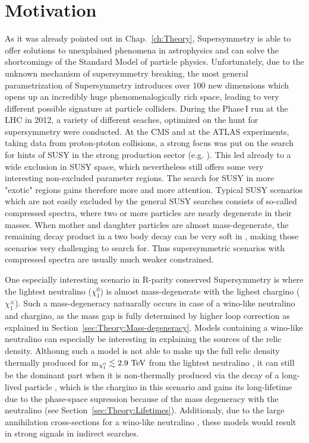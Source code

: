\section{Motivation}
\label{sec:Motivation}
As it was already pointed out in Chap.~\ref{ch:Theory}, Supersymmetry is able to offer solutions to unexplained phenomena in astrophysics and can solve the shortcomings of the Standard Model of particle physics.
Unfortunately, due to the unknown mechanism of supersymmetry breaking, the most general parametrization of Supersymmetry introduces over 100 new dimensions which opens up an incredibly huge phenomenalogically rich space, 
leading to very different possible signature at particle colliders. 
During the Phase\,I run at the LHC in 2012, a variety of different seaches, optimized on the hunt for supersymmetry were conducted.
At the CMS and at the ATLAS experiments, taking data from proton-ptoton collisions, a strong focus was put on the search for hints of SUSY in the strong production sector (e.g. \cite{bib:CMS:RA2_8TeV,bib:CMS:MT2_8TeV,bib:ATLAS:JetPlusMET_8TeV}).
This led already to a wide exclusion in SUSY space, which nevertheless still offers some very interesting non-excluded parameter regions.
The search for SUSY in more "exotic" regions gains therefore more and more attention. 
Typical SUSY scenarios which are not easily excluded by the general SUSY searches consists of so-called compressed spectra, where two or more particles are nearly degenerate in their masses.
When mother and daughter particles are almost mass-degenerate, the remaining decay product in a two body decay can be very soft in \pt, making those scenarios very challenging to search for.
Thus supersymmetric scenarios with compressed spectra are usually much weaker constrained.

One especially interesting scenario in R-parity conserved Supersymmetry is where the lightest neutralino ($\chi^{0}_1$) is almost mass-degenerate with the lighest chargino ($\chi^{\pm}_1$).
Such a mass-degeneracy natuarally occurs in case of a wino-like neutralino and chargino, as the mass gap is fully determined by higher loop correction as explained in Section~\ref{sec:Theory:Mass-degeneracy}.
Models containing a wino-like neutralino can especially be interesting in explaining the sources of the relic density.
Althoung such a model is not able to make up the full relic density thermally produced for m$_{\chi^{0}_1}\lesssim 2.9\,\,\text{Te}\kern-0.06667em\text{V}$ from the lightest neutralino \cite{bib:Ibe:DarkMatter_2015}, 
it can still be the dominant part when it is non-thermally produced via the decay of a long-lived particle \cite{bib:Moroi:DarkMatter_2013}, which is the chargino in this scenario 
and gains its long-lifetime due to the phase-space supression because of the mass degeneracy with the neutralino (see Section~\ref{sec:Theory:Lifetimes}).
Additionaly, due to the large annihilation cross-sections for a wino-like neutralino \cite{bib:Hisano:DarkMatter_2003}, these models would result in strong signals in indirect searches.\\


